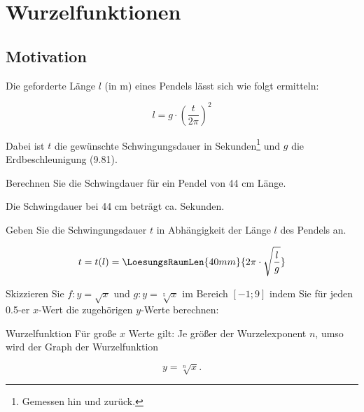\section{Wurzelfunktionen}

\subsection{Motivation}

Die geforderte Länge $l$ (in m) eines Pendels lässt sich wie folgt ermitteln:

$$l = g \cdot{} \left(\frac{t}{2\pi}\right)^2$$


Dabei ist $t$ die gewünschte Schwingungsdauer in
Sekunden\footnote{Gemessen hin und zurück.} und $g$ die
Erdbeschleunigung (9.81).

Berechnen Sie die Schwingdauer für ein Pendel von 44 cm Länge.

\vspace{4mm}

Die Schwingdauer bei 44 cm beträgt ca.  Sekunden.


Geben Sie die Schwingungsdauer $t$ in Abhängigkeit der Länge $l$ des
Pendels an.

$$t = t(l) = \LoesungsRaumLen{40mm}{2\pi \cdot{} \sqrt{\frac{l}{g}}}$$




\newpage

Skizzieren Sie $f: y = \sqrt{x}$ und $g: y=\sqrt[5]{x}$ im Bereich $[-1; 9]$ indem Sie für jeden 0.5-er $x$-Wert die zugehörigen $y$-Werte berechnen:


\begin{bemerkung}{Wurzelfunktion}{}
Für große $x$ Werte gilt: Je größer der Wurzelexponent $n$, umso
 wird der Graph der Wurzelfunktion

$$y=\sqrt[n]{x}.$$ 

\end{bemerkung}


